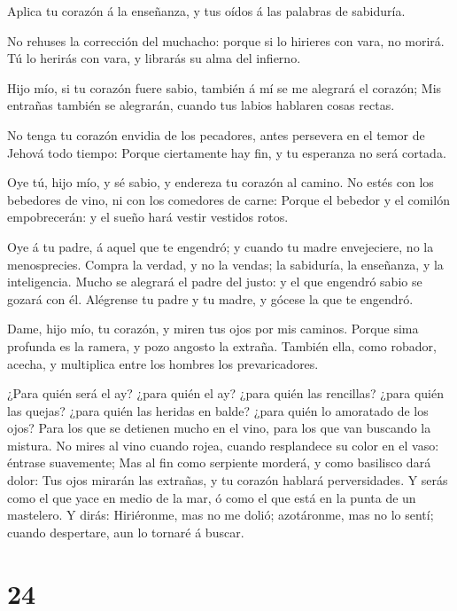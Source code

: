  Aplica tu corazón á la enseñanza, y tus oídos á las
palabras de sabiduría.

 No rehuses la corrección del muchacho: porque si lo
hirieres con vara, no morirá.  Tú lo herirás con vara, y
librarás su alma del infierno.

 Hijo mío, si tu corazón fuere sabio, también á mí se me
alegrará el corazón;  Mis entrañas también se alegrarán,
cuando tus labios hablaren cosas rectas.

 No tenga tu corazón envidia de los pecadores, antes
persevera en el temor de Jehová todo tiempo:  Porque
ciertamente hay fin, y tu esperanza no será cortada.

 Oye tú, hijo mío, y sé sabio, y endereza tu corazón al
camino.  No estés con los bebedores de vino, ni con los
comedores de carne:  Porque el bebedor y el comilón
empobrecerán: y el sueño hará vestir vestidos rotos.

 Oye á tu padre, á aquel que te engendró; y cuando tu madre
envejeciere, no la menosprecies.  Compra la verdad, y no la
vendas; la sabiduría, la enseñanza, y la inteligencia. 
Mucho se alegrará el padre del justo: y el que engendró sabio se gozará
con él.  Alégrense tu padre y tu madre, y gócese la que te
engendró.

 Dame, hijo mío, tu corazón, y miren tus ojos por mis
caminos.  Porque sima profunda es la ramera, y pozo angosto
la extraña.  También ella, como robador, acecha, y
multiplica entre los hombres los prevaricadores.

 ¿Para quién será el ay? ¿para quién el ay? ¿para quién las
rencillas? ¿para quién las quejas? ¿para quién las heridas en balde?
¿para quién lo amoratado de los ojos?  Para los que se
detienen mucho en el vino, para los que van buscando la mistura.
 No mires al vino cuando rojea, cuando resplandece su color
en el vaso: éntrase suavemente;  Mas al fin como serpiente
morderá, y como basilisco dará dolor:  Tus ojos mirarán las
extrañas, y tu corazón hablará perversidades.  Y serás como
el que yace en medio de la mar, ó como el que está en la punta de un
mastelero.  Y dirás: Hiriéronme, mas no me dolió;
azotáronme, mas no lo sentí; cuando despertare, aun lo tornaré á buscar.

\hypertarget{section-23}{%
\section{24}\label{section-23}}

